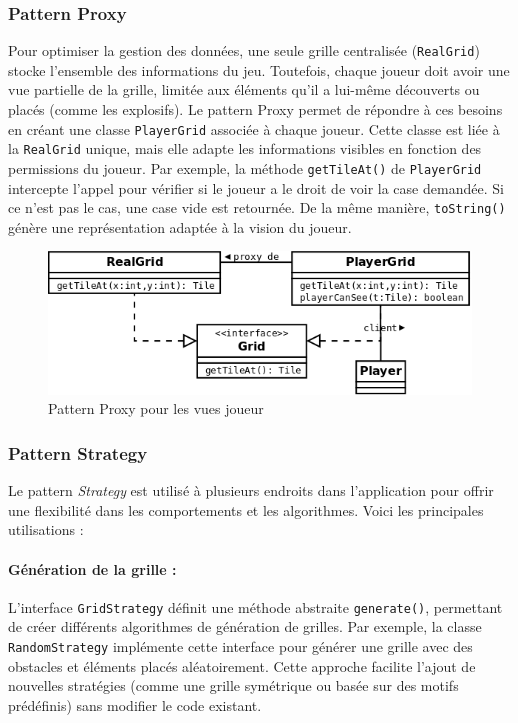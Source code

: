 \documentclass[12pt]{article}
\begin{document}
\subsubsection{Pattern Proxy}
Pour optimiser la gestion des données, une seule grille centralisée (\texttt{RealGrid}) stocke l’ensemble des informations du jeu. Toutefois, chaque joueur doit avoir une vue partielle de la grille, limitée aux éléments qu’il a lui-même découverts ou placés (comme les explosifs).
Le pattern Proxy permet de répondre à ces besoins en créant une classe \texttt{PlayerGrid} associée à chaque joueur. Cette classe est liée à la \texttt{RealGrid} unique, mais elle adapte les informations visibles en fonction des permissions du joueur.
Par exemple, la méthode \texttt{getTileAt()} de \texttt{PlayerGrid} intercepte l’appel pour vérifier si le joueur a le droit de voir la case demandée. Si ce n’est pas le cas, une case vide est retournée. De la même manière, \texttt{toString()} génère une représentation adaptée à la vision du joueur.

\begin{figure}[!h] \centering \includegraphics[scale=0.3]{images/proxy.png} \caption{Pattern Proxy pour les vues joueur} \end{figure}

\subsubsection{Pattern Strategy}

Le pattern \textit{Strategy} est utilisé à plusieurs endroits dans l'application pour offrir une flexibilité dans les comportements et les algorithmes. Voici les principales utilisations :

\paragraph{Génération de la grille :}
L'interface \texttt{GridStrategy} définit une méthode abstraite \texttt{generate()}, permettant de créer différents algorithmes de génération de grilles. Par exemple, la classe \texttt{RandomStrategy} implémente cette interface pour générer une grille avec des obstacles et éléments placés aléatoirement. Cette approche facilite l'ajout de nouvelles stratégies (comme une grille symétrique ou basée sur des motifs prédéfinis) sans modifier le code existant.
\end{document}
